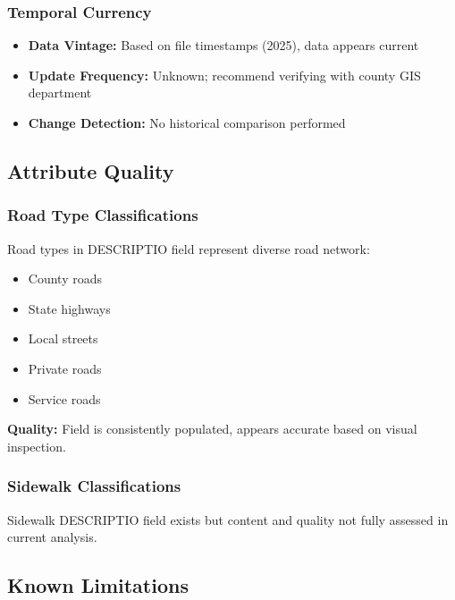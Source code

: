 \documentclass[11pt,letterpaper]{article}
\begin{document}
\subsubsection{Temporal Currency}

\begin{itemize}
    \item \textbf{Data Vintage:} Based on file timestamps (2025), data appears current
    \item \textbf{Update Frequency:} Unknown; recommend verifying with county GIS department
    \item \textbf{Change Detection:} No historical comparison performed
\end{itemize}

\subsection{Attribute Quality}

\subsubsection{Road Type Classifications}

Road types in DESCRIPTIO field represent diverse road network:
\begin{itemize}
    \item County roads
    \item State highways
    \item Local streets
    \item Private roads
    \item Service roads
\end{itemize}

\textbf{Quality:} Field is consistently populated, appears accurate based on visual inspection.

\subsubsection{Sidewalk Classifications}

Sidewalk DESCRIPTIO field exists but content and quality not fully assessed in current analysis.

\subsection{Known Limitations}
\end{document}
